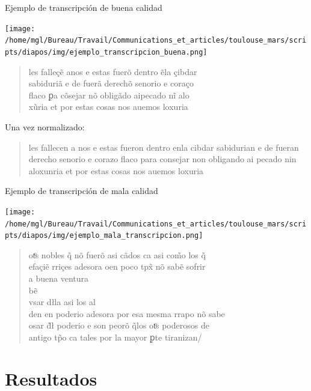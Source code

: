 \documentclass[11pt,aspectratio=169]{beamer}
\begin{document}
\begin{frame}{Ejemplo de transcripción de buena calidad}
\begin{center}
\texttt{[image: /home/mgl/Bureau/Travail/Communications\_et\_articles/toulouse\_mars/scripts/diapos/img/ejemplo\_transcripcion\_buena.png]}
\begin{quote}
les falleçẽ anos e estas fuerõ dentro ẽla çibdar
\\sabiduriã e de fuerã derechõ senorio e coraço
\\flaco ꝑa cõsejar nõ obligãdo aipecado nĩ alo
\\xũria et por estas cosas nos auemos loxuria
\end{quote}
Una vez normalizado: 
\begin{quote}
les fallecen a nos e estas fueron dentro enla cibdar sabidurian e de fueran derecho senorio e corazo flaco para consejar non obligando ai pecado nin aloxunria et por estas cosas nos auemos loxuria
\end{quote}
\end{center}
\end{frame}


\begin{frame}{Ejemplo de transcripción de mala calidad}
\begin{center}
\texttt{[image: /home/mgl/Bureau/Travail/Communications\_et\_articles/toulouse\_mars/scripts/diapos/img/ejemplo\_mala\_transcripcion.png]}
\begin{quote}
otͦs nobles q̃ nõ fuerõ asi cãdos ca asi com̃o los q̃
\\efaçiẽ rriçes adesora oen poco tpx̃ nõ sabẽ sofrir
\\a buena ventura
\\bẽ
\\vsar dłla asi los al
\\den en poderio adesora por esa mesma rrapo nõ sabe
\\osar d̃ł poderio e son peorõ q̃los otͦs poderosos de
\\antigo tp̃o ca tales por la mayor ꝑte tiranizan/
\end{quote}
\end{center}
\end{frame}



\section{Resultados}
\end{document}
